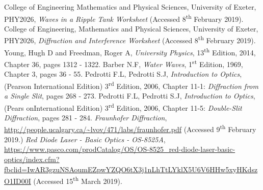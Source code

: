 \documentclass{article}
\begin{document}
\begin{thebibliography}{9}
 College of Engineering Mathematics and Physical Sciences, University of Exeter, PHY2026, \textit{Waves in a Ripple Tank Worksheet} (Accessed 8\textsuperscript{th} February 2019).
 College of Engineering, Mathematics and Physical Sciences, University of Exeter, PHY2026, \textit{Diffraction and Interference Worksheet} (Accessed 8\textsuperscript{th} February 2019).
 Young, Hugh D and Freedman, Roger A, \textit{University Physics}, 13\textsuperscript{th} Edition, 2014, Chapter 36, pages 1312 - 1322.
 Barber N.F, \textit{Water Waves}, 1\textsuperscript{st} Edition, 1969, Chapter 3, pages 36 - 55. 
 Pedrotti F.L, Pedrotti S.J, \textit{Introduction to Optics}, (Pearson International Edition) 3\textsuperscript{rd} Edition, 2006, Chapter 11-1: \textit{Diffraction from a Single Slit}, pages 268 - 273.
 Pedrotti F.L, Pedrotti S.J, \textit{Introduction to Optics},  (Pears onInternational Edition) 3\textsuperscript{rd} Edition, 2006, Chapter 11-5: \textit{Double-Slit Diffraction}, pages 281 - 284.
 \textit{Fraunhofer Diffraction}, \url{http://people.ucalgary.ca/~lvov/471/labs/fraunhofer.pdf} (Accessed 9\textsuperscript{th} February 2019.)
 \textit{Red Diode Laser - Basic Optics - OS-8525A}, 
\url{https://www.pasco.com/prodCatalog/OS/OS-8525_red-diode-laser-basic-optics/index.cfm?fbclid=IwAR3gzuNSAoumEZpwYZQO6tX3j1nLhTtLYklX5U6V6HHw5xyHKdszO1ID00I} (Accessed 15\textsuperscript{th} March 2019).

\end{thebibliography}
\end{document}
